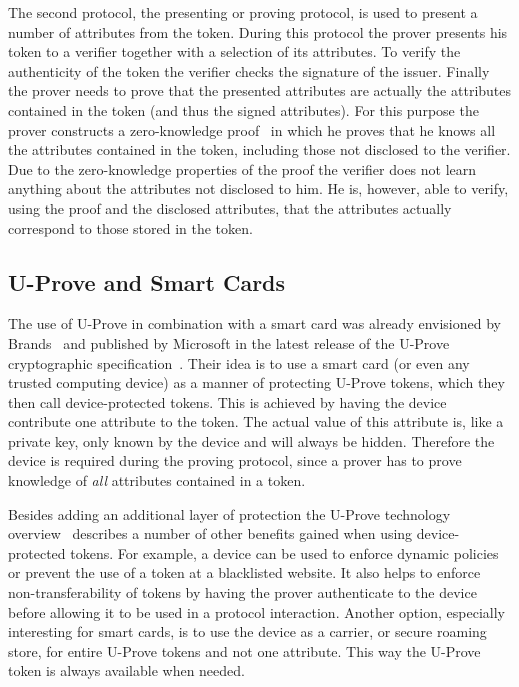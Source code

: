 The second protocol, the presenting or proving protocol, is used to present a
number of attributes from the token. During this protocol the prover presents
his token to a verifier together with a selection of its attributes. To verify
the authenticity of the token the verifier checks the signature of the issuer.
Finally the prover needs to prove that the presented attributes are actually the
attributes contained in the token (and thus the signed attributes). For this
purpose the prover constructs a zero-knowledge proof~\cite{FiatShamir1986} in
which he proves that he knows all the attributes contained in the token,
including those not disclosed to the verifier. Due to the zero-knowledge
properties of the proof the verifier does not learn anything about the
attributes not disclosed to him. He is, however, able to verify, using the proof
and the disclosed attributes, that the attributes actually correspond to those
stored in the token.

\subsection{U-Prove and Smart Cards}\label{sec:uproveandcards}

The use of U-Prove in combination with a smart card was already envisioned
by Brands~\cite{Brands2000} and published by Microsoft in the latest
release of the U-Prove cryptographic
specification~\cite{U-Prove_Crypto2011}. Their idea is to use a smart card
(or even any trusted computing device) as a manner of protecting U-Prove
tokens, which they then call device-protected tokens. This is achieved by
having the device contribute one attribute to the token. The actual value
of this attribute is, like a private key, only known by the device and will
always be hidden. Therefore the device is required during the proving
protocol, since a prover has to prove knowledge of \emph{all} attributes
contained in a token.

Besides adding an additional layer of protection the U-Prove technology
overview~\cite{U-Prove_Overview2011} describes a number of other benefits
gained when using device-protected tokens. For example, a device can be
used to enforce dynamic policies or prevent the use of a token at a
blacklisted website. It also helps to enforce non-transferability of tokens
by having the prover authenticate to the device before allowing it to be
used in a protocol interaction. Another option, especially interesting for
smart cards, is to use the device as a carrier, or secure roaming store,
for entire U-Prove tokens and not one attribute. This way the U-Prove token
is always available when needed.

